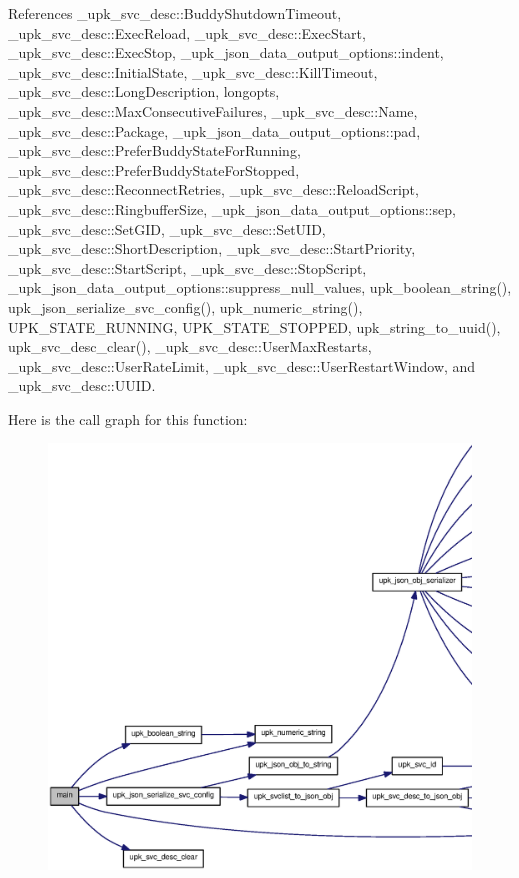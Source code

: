 References \_\-upk\_\-svc\_\-desc::BuddyShutdownTimeout, \_\-upk\_\-svc\_\-desc::ExecReload, \_\-upk\_\-svc\_\-desc::ExecStart, \_\-upk\_\-svc\_\-desc::ExecStop, \_\-upk\_\-json\_\-data\_\-output\_\-options::indent, \_\-upk\_\-svc\_\-desc::InitialState, \_\-upk\_\-svc\_\-desc::KillTimeout, \_\-upk\_\-svc\_\-desc::LongDescription, longopts, \_\-upk\_\-svc\_\-desc::MaxConsecutiveFailures, \_\-upk\_\-svc\_\-desc::Name, \_\-upk\_\-svc\_\-desc::Package, \_\-upk\_\-json\_\-data\_\-output\_\-options::pad, \_\-upk\_\-svc\_\-desc::PreferBuddyStateForRunning, \_\-upk\_\-svc\_\-desc::PreferBuddyStateForStopped, \_\-upk\_\-svc\_\-desc::ReconnectRetries, \_\-upk\_\-svc\_\-desc::ReloadScript, \_\-upk\_\-svc\_\-desc::RingbufferSize, \_\-upk\_\-json\_\-data\_\-output\_\-options::sep, \_\-upk\_\-svc\_\-desc::SetGID, \_\-upk\_\-svc\_\-desc::SetUID, \_\-upk\_\-svc\_\-desc::ShortDescription, \_\-upk\_\-svc\_\-desc::StartPriority, \_\-upk\_\-svc\_\-desc::StartScript, \_\-upk\_\-svc\_\-desc::StopScript, \_\-upk\_\-json\_\-data\_\-output\_\-options::suppress\_\-null\_\-values, upk\_\-boolean\_\-string(), upk\_\-json\_\-serialize\_\-svc\_\-config(), upk\_\-numeric\_\-string(), UPK\_\-STATE\_\-RUNNING, UPK\_\-STATE\_\-STOPPED, upk\_\-string\_\-to\_\-uuid(), upk\_\-svc\_\-desc\_\-clear(), \_\-upk\_\-svc\_\-desc::UserMaxRestarts, \_\-upk\_\-svc\_\-desc::UserRateLimit, \_\-upk\_\-svc\_\-desc::UserRestartWindow, and \_\-upk\_\-svc\_\-desc::UUID.



Here is the call graph for this function:
\nopagebreak
\begin{figure}[H]
\begin{center}
\leavevmode
\includegraphics[width=400pt]{upk_8c_a647f21a28344e1d9c643f4115516d7c9_cgraph}
\end{center}
\end{figure}




